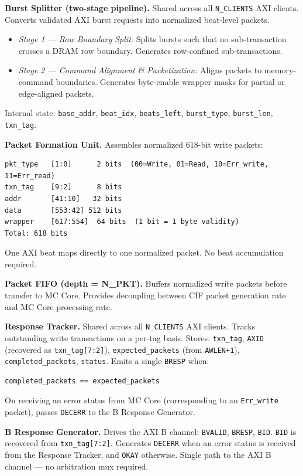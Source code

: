 \textbf{Burst Splitter (two-stage pipeline).}
Shared across all \texttt{N\_CLIENTS} AXI clients. Converts validated AXI burst requests into normalized beat-level packets.
\begin{itemize}[noitemsep]
    \item \textit{Stage 1 — Row Boundary Split:} Splits bursts such that no sub-transaction crosses a DRAM row boundary. Generates row-confined sub-transactions.
    \item \textit{Stage 2 — Command Alignment \& Packetization:} Aligns packets to memory-command boundaries. Generates byte-enable wrapper masks for partial or edge-aligned packets.
\end{itemize}
Internal state: \texttt{base\_addr}, \texttt{beat\_idx}, \texttt{beats\_left}, \texttt{burst\_type}, \texttt{burst\_len}, \texttt{txn\_tag}.

\textbf{Packet Formation Unit.}
Assembles normalized 618-bit write packets:
\begin{lstlisting}
pkt_type   [1:0]      2 bits  (00=Write, 01=Read, 10=Err_write, 11=Err_read)
txn_tag    [9:2]      8 bits
addr       [41:10]   32 bits
data       [553:42] 512 bits
wrapper    [617:554]  64 bits  (1 bit = 1 byte validity)
Total: 618 bits
\end{lstlisting}
One AXI beat maps directly to one normalized packet. No beat accumulation required.

\textbf{Packet FIFO (depth = N\_PKT).}
Buffers normalized write packets before transfer to MC Core. Provides decoupling between CIF packet generation rate and MC Core processing rate.

\textbf{Response Tracker.}
Shared across all \texttt{N\_CLIENTS} AXI clients. Tracks outstanding write transactions on a per-tag basis. Stores: \texttt{txn\_tag}, \texttt{AXID} (recovered as \texttt{txn\_tag[7:2]}), \texttt{expected\_packets} (from \texttt{AWLEN+1}), \texttt{completed\_packets}, \texttt{status}. Emits a single \texttt{BRESP} when:
\begin{lstlisting}
completed_packets == expected_packets
\end{lstlisting}
On receiving an error status from MC Core (corresponding to an \texttt{Err\_write} packet), passes \texttt{DECERR} to the B Response Generator.

\textbf{B Response Generator.}
Drives the AXI B channel: \texttt{BVALID}, \texttt{BRESP}, \texttt{BID}. \texttt{BID} is recovered from \texttt{txn\_tag[7:2]}. Generates \texttt{DECERR} when an error status is received from the Response Tracker, and \texttt{OKAY} otherwise. Single path to the AXI B channel — no arbitration mux required.

